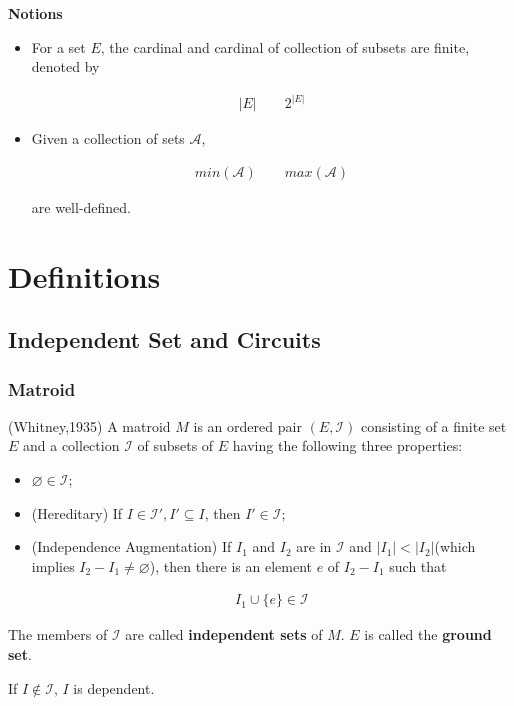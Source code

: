 \documentclass[Total.tex]{subfiles}
\begin{document}
	\textbf{Notions}
	
	\begin{itemize}
		\item For a set $E$, the cardinal and cardinal of collection of subsets are finite, denoted by
		
		\begin{gather*}
			|E|\qquad 2^{|E|}
		\end{gather*}
		
		\item Given a collection of sets $\mathcal{A}$, 
		
		\begin{gather*}
			min(\mathcal{A})\qquad max(\mathcal{A})
		\end{gather*}
		
		are well-defined.
	\end{itemize}
	
	\chapter{Definitions}
		\section{Independent Set and Circuits}
		
			\subsection{Matroid}
		
			\begin{Def}
				\label{Matroid-Matroid}(Whitney,1935) A matroid $M$ is an ordered pair $(E,\mathcal{I})$ consisting of a finite set $E$ and a collection $\mathcal{I}$ of subsets of $E$ having the following three properties:
				
				\begin{itemize}
					\item $\varnothing\in \mathcal{I}$;
					\item (Hereditary) If $I\in \mathcal{I}',I'\subseteq I$, then $I'\in \mathcal{I}$;
					\item (Independence Augmentation) If $I_1$ and $I_2$ are in $\mathcal{I}$ and $|I_1|<|I_2|$(which implies $I_2-I_1\not=\varnothing$), then there is an element $e$ of $I_2-I_1$ such that
					
					\begin{gather*}
						I_1\cup \{e\}\in \mathcal{I}
					\end{gather*}
				\end{itemize}
				
				The members of $\mathcal{I}$ are called \textbf{independent sets} of $M$. $E$ is called the \textbf{ground set}. 
				
				If $I\notin \mathcal{I}$, $I$ is dependent.
			\end{Def}
			
\end{document}
